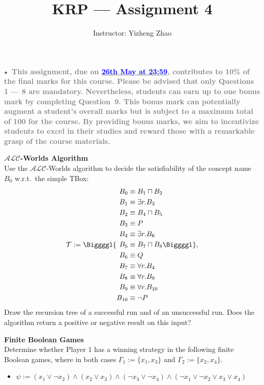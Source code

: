 \documentclass[12pt,a4paper]{article}
\newenvironment{problem}[2][{\color{red}Question}]{\begin{trivlist}
\item[\hskip \labelsep {\bfseries #1}\hskip \labelsep {\bfseries #2.}]}{\end{trivlist}}
\begin{document}
\title{{\color{blue}KRP --- Assignment 4}}
\author{Instructor: Yizheng Zhao}

 
\maketitle

\textbf{$\star$~\textcolor{gray}{This assignment, due on \underline{\textcolor{blue}{26th May at 23:59}}, contributes to 10\% of the final marks for this course. Please be advised that only Questions 1 --- 8 are mandatory. Nevertheless, students can earn up to one bonus mark by completing Question~9. This bonus mark can potentially augment a student's overall marks but is subject to a maximum total of 100 for the course. By providing bonus marks, we aim to incentivize students to excel in their studies and reward those with a remarkable grasp of the course materials.}}

\begin{problem}{{\color{red}1}}
\textbf{$\mathcal{ALC}$-Worlds Algorithm}\\
Use the $\mathcal{ALC}$-Worlds algorithm to decide the satisfiability of the concept name $B_0$ w.r.t.\ the simple TBox:
\begin{equation*}
\mathcal{T}:=\Biggggl\{
  \begin{aligned}
B_0&\equiv B_1\sqcap B_2\\
B_1&\equiv\exists r.B_3\\
B_2&\equiv B_4\sqcap B_5\\
B_3&\equiv P\\
  B_4&\equiv\exists r.B_6\\
  B_5&\equiv B_7\sqcap B_8\\
  B_6&\equiv Q\\
  B_7&\equiv\forall r.B_4\\
  B_8&\equiv\forall r.B_9\\
  B_9&\equiv\forall r.B_{10}\\
  B_{10}&\equiv\neg P
  \end{aligned}
  \Biggggl\},
\end{equation*}
Draw the recursion tree of a successful run and of an unsuccessful run. Does the algorithm return a positive or negative result on this input?
\end{problem}

\begin{problem}{{\color{red}2}}
\textbf{Finite Boolean Games}\\
Determine whether Player $1$ has a winning strategy in the following finite Boolean games, where in both cases $\Gamma_{1}:=\{x_1, x_3\}$ and $\Gamma_{2}:=\{x_2, x_4\}$.

\begin{itemize}
\item[-] $\psi :=(x_{1}\vee\neg x_{2})\wedge(x_{2}\vee x_{3})\wedge(\neg x_{3}\vee\neg x_{4})\wedge(\neg x_{1}\vee \neg x_{2}\vee x_{3}\vee x_{4})$
\end{itemize}
\end{problem}
\end{document}
